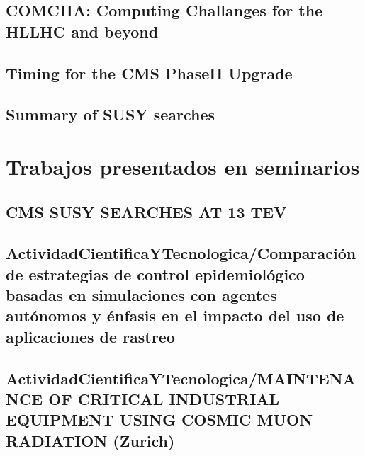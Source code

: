 \documentclass[a4paper, 11pt, twoside, openright]{report}
\begin{document}
\subsection{COMCHA: Computing Challanges for the HLLHC and beyond}

\subsection{Timing for the CMS PhaseII Upgrade}

\subsection{Summary of SUSY searches}



\section{Trabajos presentados en seminarios}

\subsection{CMS SUSY SEARCHES AT 13 TEV}


\subsection{ActividadCientificaYTecnologica/Comparación de estrategias de control epidemiológico basadas en simulaciones con agentes autónomos y énfasis en el impacto del uso de aplicaciones de rastreo}


\subsection{ActividadCientificaYTecnologica/MAINTENANCE OF CRITICAL INDUSTRIAL EQUIPMENT USING COSMIC MUON RADIATION (Zurich)}

\end{document}
